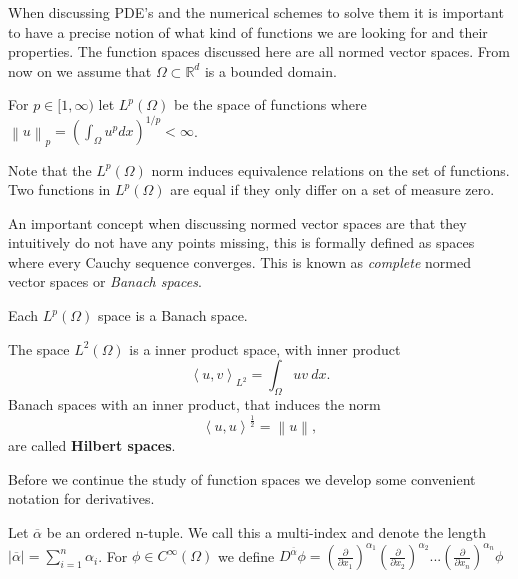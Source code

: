 \documentclass[../Main/main.tex]{subfiles}
\begin{document}
	When discussing PDE's and the numerical schemes to solve them it is important to have a precise notion of what kind of functions we are looking for and their properties. The function spaces discussed here are all normed vector spaces. From now on we assume that $\Omega \subset \mathbb{R}^d$ is a bounded domain.
	\begin{definition}
		For $p\in [1,\infty)$ let $L^p(\Omega)$ be the space of functions where  $\left \| u \right \|_p = (\int_{\Omega} u^pdx)^{1/p} <\infty$.
	\end{definition}

	\begin{remark}
		Note that the $L^p(\Omega)$ norm induces equivalence relations on the set of functions. Two functions in $L^p(\Omega)$ are equal if they only differ on a set of measure zero.
	\end{remark}
	An important concept when discussing normed vector spaces are that they intuitively do not have any points missing, this is formally defined as spaces where every Cauchy sequence converges. This is known as \emph{complete} normed vector spaces or \emph{Banach spaces}.
	
	\begin{theorem}\label{theorem:Riesz-Fischer}
		Each $L^p(\Omega)$ space is a Banach space.
	\end{theorem}
	\begin{remark}
		The space $L^2(\Omega)$ is a inner product space, with inner product
		\begin{equation*}
			\left \langle u,v\right \rangle_{L^2} = \int_{\Omega}uv \ dx.
		\end{equation*}
		 Banach spaces with an inner product, that induces the norm 
		\begin{equation*}
			\left \langle u,u \right \rangle ^{\frac{1}{2}} = \left \| u \right \|,
		\end{equation*}
		are called \textbf{Hilbert spaces}. 
	\end{remark}
	
	
	
	
	Before we continue the study of function spaces we develop some convenient notation for derivatives.
	
	\begin{definition}
		Let $\overline{\alpha}$ be an ordered n-tuple. We call this a multi-index and denote the length $|\overline{\alpha}| = \sum_{i=1}^n 		\alpha_i$.
		For $\phi \in C^{\infty}(\Omega)$ we define $D^{\overline{\alpha}}\phi = (\frac{\partial }{\partial x_1})^{\alpha_1}(\frac{\partial }{\partial x_2})^{\alpha_2}...(\frac{\partial }{\partial x_n})^{\alpha_n}\phi$
	\end{definition}
	
\end{document}

